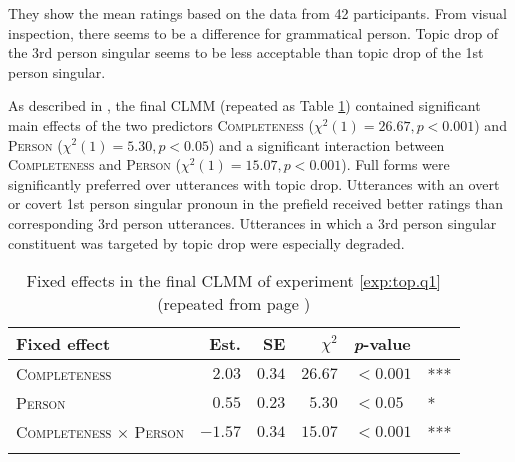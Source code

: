 \noindent
They show the mean ratings based on the data from 42 participants.
From visual inspection, there seems to be a difference for grammatical person.
Topic drop of the 3rd person singular seems to be less acceptable than topic drop of the 1st person singular.

As described in , the final CLMM (repeated as Table \ref{tab:model.exp.top.q1.rep}) contained significant main effects of the two predictors \textsc{Completeness} ($\chi^2(1) = 26.67, p < 0.001$) and \textsc{Person} ($\chi^2(1) = 5.30, p < 0.05$) and a significant interaction between \textsc{Completeness} and \textsc{Person} ($\chi^2(1) = 15.07, p < 0.001$).
Full forms were significantly preferred over utterances with topic drop.
Utterances with an overt or covert 1st person singular pronoun in the prefield received better ratings than corresponding 3rd person utterances.
Utterances in which a 3rd person singular constituent was targeted by topic drop were especially degraded.

\begin{table}
\caption{Fixed effects in the final CLMM of experiment \ref*{exp:top.q1} (repeated from page \pageref{tab:model.exp.top.q1})}
\centering
\begin{tabular}{lrrrll}
\lsptoprule
Fixed effect & Est. & SE & $\chi^2$ & \textit{p}-value &   \\
\midrule
\textsc{Completeness} & $2.03$ & $0.34$ & $26.67$ & $< 0.001$ & ***\\
\textsc{Person} & $0.55$ & $0.23$ & $5.30$ & $< 0.05$ & *\\
\textsc{Completeness $\times$ Person} & $-1.57$ & $0.34$ & $15.07$ & $< 0.001$ & ***\\
\lspbottomrule
\end{tabular}
\label{tab:model.exp.top.q1.rep}
\end{table}

